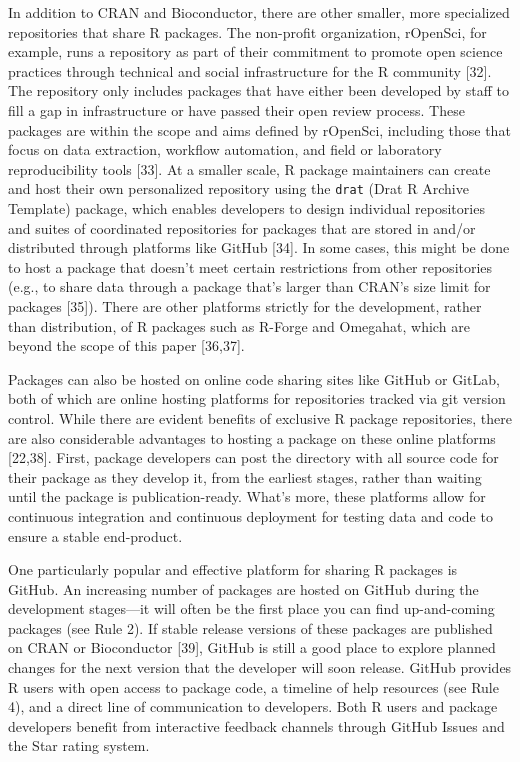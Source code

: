 \documentclass[10pt,letterpaper]{article}
\begin{document}
In addition to CRAN and Bioconductor, there are other smaller, more
specialized repositories that share R packages. The non-profit
organization, rOpenSci, for example, runs a repository as part of their
commitment to promote open science practices through technical and
social infrastructure for the R community {[}32{]}. The repository only
includes packages that have either been developed by staff to fill a gap
in infrastructure or have passed their open review process. These
packages are within the scope and aims defined by rOpenSci, including
those that focus on data extraction, workflow automation, and field or
laboratory reproducibility tools {[}33{]}. At a smaller scale, R package
maintainers can create and host their own personalized repository using
the \texttt{drat} (Drat R Archive Template) package, which enables
developers to design individual repositories and suites of coordinated
repositories for packages that are stored in and/or distributed through
platforms like GitHub {[}34{]}. In some cases, this might be done to
host a package that doesn't meet certain restrictions from other
repositories (e.g., to share data through a package that's larger than
CRAN's size limit for packages {[}35{]}). There are other platforms
strictly for the development, rather than distribution, of R packages
such as R-Forge and Omegahat, which are beyond the scope of this paper
{[}36,37{]}.

Packages can also be hosted on online code sharing sites like GitHub or
GitLab, both of which are online hosting platforms for repositories
tracked via git version control. While there are evident benefits of
exclusive R package repositories, there are also considerable advantages
to hosting a package on these online platforms {[}22,38{]}. First,
package developers can post the directory with all source code for their
package as they develop it, from the earliest stages, rather than
waiting until the package is publication-ready. What's more, these
platforms allow for continuous integration and continuous deployment for
testing data and code to ensure a stable end-product.

One particularly popular and effective platform for sharing R packages
is GitHub. An increasing number of packages are hosted on GitHub during
the development stages---it will often be the first place you can find
up-and-coming packages (see Rule 2). If stable release versions of these
packages are published on CRAN or Bioconductor {[}39{]}, GitHub is still
a good place to explore planned changes for the next version that the
developer will soon release. GitHub provides R users with open access to
package code, a timeline of help resources (see Rule 4), and a direct
line of communication to developers. Both R users and package developers
benefit from interactive feedback channels through GitHub Issues and the
Star rating system.
\end{document}
